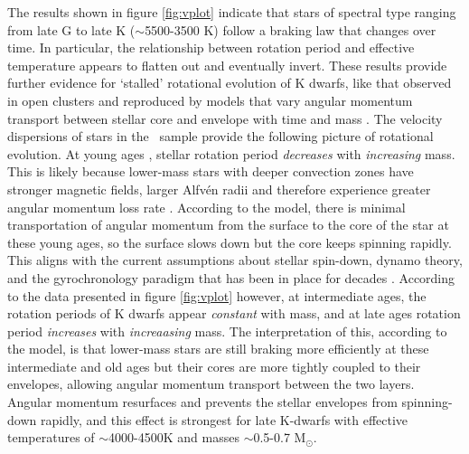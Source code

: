 The results shown in figure \ref{fig:vplot} indicate that stars of spectral
type ranging from late G to late K ($\sim$5500-3500 K) follow a braking law
that changes over time.
In particular, the relationship between rotation period and effective
temperature appears to flatten out and eventually invert.
These results provide further evidence for `stalled' rotational evolution of K
dwarfs, like that observed in open clusters \citep{curtis2019} and reproduced
by models that vary angular momentum transport between stellar core and
envelope with time and mass \citep{spada2019}.
The velocity dispersions of stars in the \mct\ sample provide the following
picture of rotational evolution.
At young ages \citep[younger than around 1 Gyr but still old enough to be on
the main sequence and have transitioned from the `I' sequence to the `C'
sequence ][]{barnes2003}, stellar rotation period {\it decreases} with {\it
increasing} mass.
This is likely because lower-mass stars with deeper convection zones have
stronger magnetic fields, larger Alfv\'en radii and therefore experience
greater angular momentum loss rate \citep[\eg][]{schatzman1962, parker1970,
kawaler1988, charbonneau2010}.
According to the \citet{spada2019} model, there is minimal transportation of
angular momentum from the surface to the core of the star at these young ages,
so the surface slows down but the core keeps spinning rapidly.
This aligns with the current assumptions about stellar spin-down, dynamo
theory, and the gyrochronology paradigm that has been in place for decades
\citep[\eg][]{skumanich1972, noyes1984, kawaler1988, barnes2003, angus2019}.
According to the data presented in figure \ref{fig:vplot} however, at
intermediate ages, the rotation periods of K dwarfs appear {\it constant} with
mass, and at late ages rotation period {\it increases} with {\it increaasing}
mass.
The interpretation of this, according to the \citet{spada2019} model, is that
lower-mass stars are still braking more efficiently at these intermediate and
old ages but their cores are more tightly coupled to their envelopes, allowing
angular momentum transport between the two layers.
Angular momentum resurfaces and prevents the stellar envelopes from
spinning-down rapidly, and this effect is strongest for late K-dwarfs with
effective temperatures of $\sim$4000-4500K and masses $\sim$0.5-0.7 M$_\odot$.

